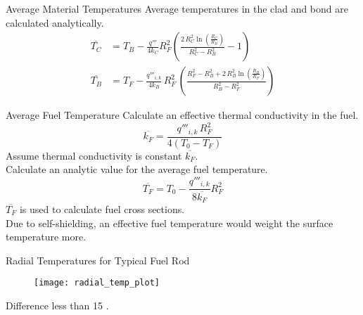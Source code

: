 \begin{frame}{Average Material Temperatures}
  Average temperatures in the clad and bond are calculated analytically.
  \begin{align}
    \label{eq:tc_bar}
    \overline{T_C} &= T_B - \frac{q'''}{4 k_C} R_F^2 \left(
      \frac{2 \, R_C^2 \ln\left(\frac{R_C}{R_B}\right)}
      {R_C^2 - R_B^2}  - 1\right) \\
    \label{eq:tb_bar}
    \overline{T_B} &= T_F - \frac{q'''_{i,k}}{4 k_B} \, R_F^2 \, \left(
      \frac{R_F^2 - R_B^2 + 2\,R_B^2 \ln\left(\frac{R_B}{R_F}\right)}
      {R_B^2-R_F^2}\right)
  \end{align}
\end{frame}

\begin{frame}{Average Fuel Temperature}
  Calculate an effective thermal conductivity in the fuel.
  \begin{equation}
    \label{eq:kfuel_constant}
    \overline{k_F} = \frac{q'''_{i,k} \, R_F^2}{4(T_0-T_F)}
  \end{equation}
  Assume thermal conductivity is constant $\overline{k_F}$.\\
  Calculate an analytic value for the average fuel temperature.
  \begin{equation}
    \label{eq:tf_bar}
    \overline{T_F} = T_0 - \frac{q'''_{i,k}}{8 \overline{k_F}} R_F^2
  \end{equation}
  $\overline{T_F}$ is used to calculate fuel cross sections. \\
  Due to self-shielding, an effective fuel temperature would weight the surface 
  temperature more.
\end{frame}

\begin{frame}{Radial Temperatures for Typical Fuel Rod}
  \begin{figure}
    \centering
    \texttt{[image: radial\_temp\_plot]}
    \label{fig:radial_temp_plot}
  \end{figure}
  \begin{block}{}
    \centering
    Difference less than 15 .
  \end{block}
\end{frame}

